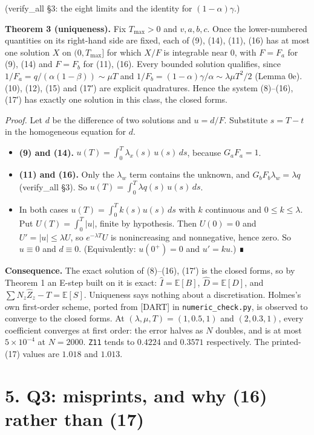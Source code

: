 \documentclass[10pt,]{article}
\providecommand{\tightlist}{%
  \setlength{\itemsep}{0pt}\setlength{\parskip}{0pt}}
\begin{document}
(verify\_all §3: the eight limits and the identity for
\((1-\alpha)\gamma\).)

\textbf{Theorem 3 (uniqueness).} Fix \(T_{\max}>0\) and \(v,a,b,c\).
Once the lower-numbered quantities on its right-hand side are fixed,
each of (9), (14), (11), (16) has at most one solution \(X\) on
\((0,T_{\max}]\) for which \(X/F\) is integrable near 0, with \(F=F_a\)
for (9), (14) and \(F=F_b\) for (11), (16). Every bounded solution
qualifies, since \(1/F_a=q/(\alpha(1-\beta))\sim\mu T\) and
\(1/F_b=(1-\alpha)\gamma/\alpha\sim\lambda\mu T^2/2\) (Lemma 0e). (10),
(12), (15) and (17′) are explicit quadratures. Hence the system
(8)--(16), (17′) has exactly one solution in this class, the closed
forms.

\emph{Proof.} Let \(d\) be the difference of two solutions and
\(u=d/F\). Substitute \(s=T-t\) in the homogeneous equation for \(d\).

\begin{itemize}
\tightlist
\item
  \textbf{(9) and (14).} \(u(T)=\int_0^T\lambda_x(s)\,u(s)\,ds\),
  because \(G_aF_a=1\).
\item
  \textbf{(11) and (16).} Only the \(\lambda_w\) term contains the
  unknown, and \(G_bF_b\lambda_w=\lambda q\) (verify\_all §3). So
  \(u(T)=\int_0^T\lambda q(s)\,u(s)\,ds\).
\item
  In both cases \(u(T)=\int_0^Tk(s)u(s)\,ds\) with \(k\) continuous and
  \(0\le k\le\lambda\). Put \(U(T)=\int_0^T|u|\), finite by hypothesis.
  Then \(U(0)=0\) and \(U'=|u|\le\lambda U\), so \(e^{-\lambda T}U\) is
  nonincreasing and nonnegative, hence zero. So \(u\equiv0\) and
  \(d\equiv0\). (Equivalently: \(u(0^+)=0\) and \(u'=ku\).) ∎
\end{itemize}

\textbf{Consequence.} The exact solution of (8)--(16), (17′) is the
closed forms, so by Theorem 1 an E-step built on it is exact:
\(\hat I=\mathbb E[B]\), \(\hat D=\mathbb E[D]\), and
\(\sum N_z\hat Z_z-T=\mathbb E[S]\). Uniqueness says nothing about a
discretisation. Holmes's own first-order scheme, ported from {[}DART{]}
in \texttt{numeric\_check.py}, is observed to converge to the closed
forms. At \((\lambda,\mu,T)=(1,0.5,1)\) and \((2,0.3,1)\), every
coefficient converges at first order: the error halves as \(N\) doubles,
and is at most \(5\times10^{-4}\) at \(N=2000\). \texttt{Z11} tends to
\(0.4224\) and \(0.3571\) respectively. The printed-(17) values are
\(1.018\) and \(1.013\).

\hypertarget{q3-misprints-and-why-16-rather-than-17}{%
\section{5. Q3: misprints, and why (16) rather than
(17)}\label{q3-misprints-and-why-16-rather-than-17}}
\end{document}
